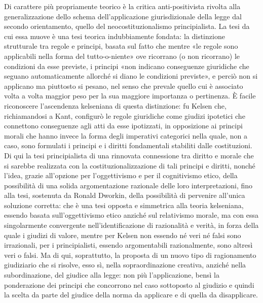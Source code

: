 Di carattere più propriamente teorico è la critica anti-positivista rivolta alla generalizzazione dello schema dell’applicazione giurisdizionale della legge dal secondo orientamento, quello del neocostituzionalismo principialista. La tesi da cui essa muove è una tesi teorica indubbiamente fondata: la distinzione strutturale tra regole e principi, basata sul fatto che mentre «le regole sono applicabili nella forma del tutto-o-niente» ove ricorrano (o non ricorrano) le condizioni da esse previste, i principi «non indicano conseguenze giuridiche che seguano automaticamente allorché si diano le condizioni previste», e perciò non si applicano ma piuttosto si pesano, nel senso che prevale quello cui è associato volta a volta maggior peso per la sua maggiore importanza o pertinenza. È facile riconoscere l’ascendenza kelseniana di questa distinzione: fu Kelsen che, richiamandosi a Kant, configurò le regole giuridiche come giudizi ipotetici che connettono conseguenze agli atti da esse ipotizzati, in opposizione ai principi morali che hanno invece la forma degli imperativi categorici nella quale, non a caso, sono formulati i principi e i diritti fondamentali stabiliti dalle costituzioni. Di qui la tesi principialista di una rinnovata connessione tra diritto e morale che si sarebbe realizzata con la costituzionalizzazione di tali principi e diritti, nonché l’idea, grazie all’opzione per l’oggettivismo e per il cognitivismo etico, della possibilità di una solida argomentazione razionale delle loro interpretazioni, fino alla tesi, sostenuta da Ronald Dworkin, della possibilità di pervenire all’unica soluzione corretta: che è una tesi opposta e simmetrica alla teoria kelseniana, essendo basata sull’oggettivismo etico anziché sul relativismo morale, ma con essa singolarmente convergente nell’identificazione di razionalità e verità, in forza della quale i giudizi di valore, mentre per Kelsen non essendo né veri né falsi sono irrazionali, per i principialisti, essendo argomentabili razionalmente, sono altresì veri o falsi. Ma di qui, soprattutto, la proposta di un nuovo tipo di ragionamento giudiziario che si risolve, esso sì, nella sopraordinazione creativa, anziché nella subordinazione, del giudice alla legge: non più l’applicazione, bensì la ponderazione dei principi che concorrono nel caso sottoposto al giudizio e quindi la scelta da parte del giudice della norma da applicare e di quella da disapplicare.
